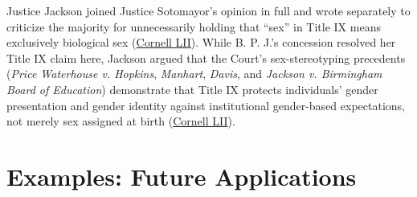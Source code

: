 \documentclass[12pt]{article}
\begin{document}
Justice Jackson joined Justice Sotomayor's opinion in full and wrote separately to criticize the majority for unnecessarily holding that ``sex'' in Title IX means exclusively biological sex (\href{https://www.law.cornell.edu/supremecourt/text/24-43}{Cornell LII}). While B. P. J.'s concession resolved her Title IX claim here, Jackson argued that the Court's sex-stereotyping precedents (\textit{Price Waterhouse v. Hopkins}, \textit{Manhart}, \textit{Davis}, and \textit{Jackson v. Birmingham Board of Education}) demonstrate that Title IX protects individuals' gender presentation and gender identity against institutional gender-based expectations, not merely sex assigned at birth (\href{https://www.law.cornell.edu/supremecourt/text/24-43}{Cornell LII}).

\section{Examples: Future Applications}
\end{document}
